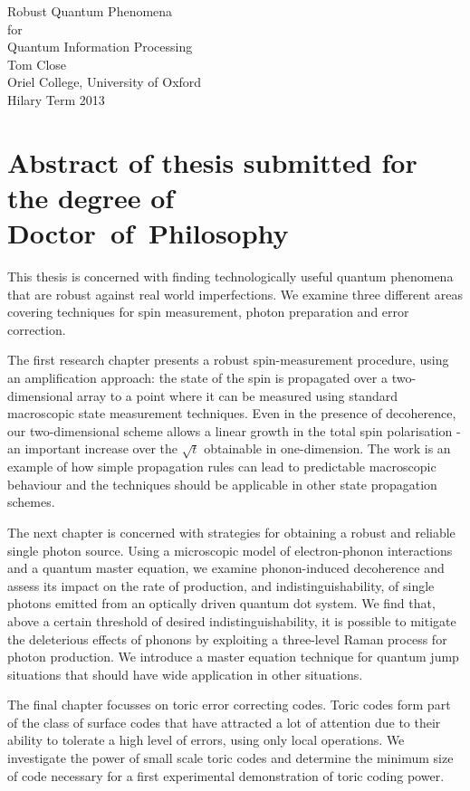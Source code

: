 \vspace{-2cm}
\enlargethispage{2cm}
\begin{center}

  {\Huge Robust Quantum Phenomena \\[0.0cm] 
               for \\[0.3cm] 
               Quantum Information Processing}\\[1cm]

  {\large Tom Close\\
               Oriel College, University of Oxford\\
               Hilary Term 2013\\[1cm]
  }

\end{center}
 
\section*{Abstract of thesis submitted for the degree of \mbox{Doctor of Philosophy}} 

This thesis is concerned with finding technologically useful quantum phenomena that are robust against real world imperfections. We examine three different areas covering techniques for spin measurement, photon preparation and error correction.

The first research chapter presents a robust spin-measurement procedure, using an amplification approach: the state of the spin is propagated over a two-dimensional array to a point where it can be measured using standard macroscopic state measurement techniques. Even in the presence of decoherence, our two-dimensional scheme allows a linear growth in the total spin polarisation - an important increase over the $\sqrt{t}$ obtainable in one-dimension. The work is an example of how simple propagation rules can lead to predictable macroscopic behaviour and the techniques should be applicable in other state propagation schemes. 

The next chapter is concerned with strategies for obtaining a robust and reliable single photon source. Using a microscopic model of electron-phonon interactions and a quantum master equation, we examine phonon-induced decoherence and assess its impact on the rate of production, and indistinguishability, of single photons emitted from an optically driven quantum dot system. We find that, above a certain threshold of desired indistinguishability, it is possible to mitigate the deleterious effects of phonons by exploiting a three-level Raman process for photon production. We introduce a master equation technique for quantum jump situations that should have wide application in other situations.

The final chapter focusses on toric error correcting codes. Toric codes form part of the class of surface codes that have attracted a lot of attention due to their ability to tolerate a high level of errors, using only local operations. We investigate the power of small scale toric codes and determine the minimum size of code necessary for a first experimental demonstration of toric coding power.


